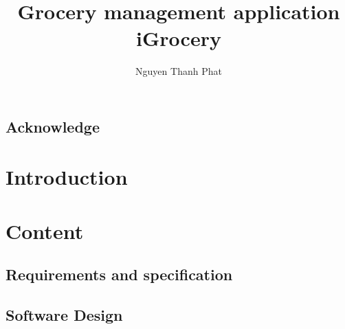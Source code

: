 \documentclass[a4paper,12pt,oneside]{report}
\title{Grocery management application iGrocery}  	%
\author{Nguyen Thanh Phat}							%
\begin{document}


\chapter*{Acknowledge}


\tableofcontents
\listoffigures
\listoftables

\clearpage
{}			%



\part{Introduction}


\part{Content}
\chapter{Requirements and specification}


\chapter{Software Design}

\end{document}
